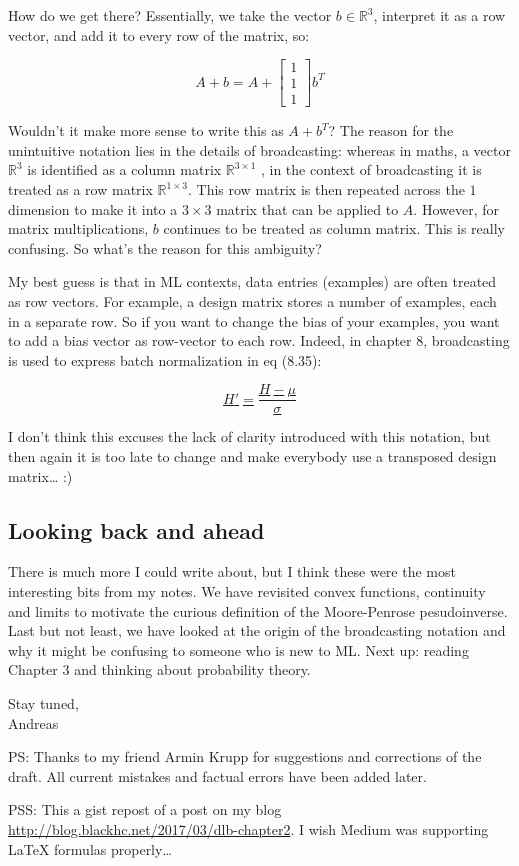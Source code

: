 \documentclass[]{scrartcl}
\begin{document}
How do we get there? Essentially, we take the vector
\(b \in \mathbb{R}^3\), interpret it as a row vector, and add it to
every row of the matrix, so:

\[ A + b= A + \left[\begin{matrix}1\\1\\1\end{matrix}\right] b^T \]

Wouldn't it make more sense to write this as \(A + b^T\)? The reason for
the unintuitive notation lies in the details of broadcasting: whereas in
maths, a vector \(\mathbb{R}^3\) is identified as a column matrix
\(\mathbb{R}^{3 \times 1}\) , in the context of broadcasting it is
treated as a row matrix \(\mathbb{R}^{1 \times 3}\). This row matrix is
then repeated across the \(1\) dimension to make it into a
\(3 \times 3\) matrix that can be applied to \(A\). However, for matrix
multiplications, \(b\) continues to be treated as column matrix. This is
really confusing. So what's the reason for this ambiguity?

My best guess is that in ML contexts, data entries (examples) are often
treated as row vectors. For example, a design matrix stores a number of
examples, each in a separate row. So if you want to change the bias of
your examples, you want to add a bias vector as row-vector to each row.
Indeed, in chapter 8, broadcasting is used to express batch
normalization in eq (8.35):

\href{http://www.deeplearningbook.org/contents/optimization.html\#pf2d}{\[H'=\dfrac{H-\mu}{\sigma}\]}

I don't think this excuses the lack of clarity introduced with this
notation, but then again it is too late to change and make everybody use
a transposed design matrix\ldots{} :)

\subsection{Looking back and ahead}\label{looking-back-and-ahead}

There is much more I could write about, but I think these were the most
interesting bits from my notes. We have revisited convex functions,
continuity and limits to motivate the curious definition of the
Moore-Penrose pesudoinverse. Last but not least, we have looked at the
origin of the broadcasting notation and why it might be confusing to
someone who is new to ML. Next up: reading Chapter 3 and thinking about
probability theory.

Stay tuned,\\
Andreas

PS: Thanks to my friend Armin Krupp for suggestions and corrections of
the draft. All current mistakes and factual errors have been added
later.

PSS: This a gist repost of a post on my blog
\href{http://blog.blackhc.net/2017/03/dlb-chapter2}{http://blog.blackhc.net/2017/03/dlb-chapter2}. I wish Medium
was supporting LaTeX formulas properly\ldots{}
\end{document}
